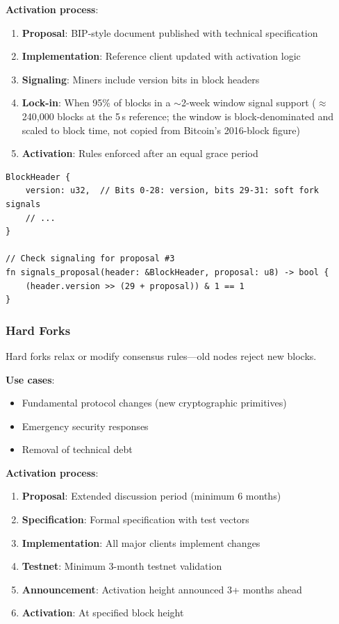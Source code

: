 \textbf{Activation process}:
\begin{enumerate}
  \item \textbf{Proposal}: BIP-style document published with technical specification
  \item \textbf{Implementation}: Reference client updated with activation logic
  \item \textbf{Signaling}: Miners include version bits in block headers
  \item \textbf{Lock-in}: When 95\% of blocks in a $\sim$2-week window signal
    support ($\approx$240{,}000 blocks at the 5\,s reference; the window is
    block-denominated and scaled to block time, not copied from Bitcoin's
    2016-block figure)
  \item \textbf{Activation}: Rules enforced after an equal grace period
\end{enumerate}

\begin{lstlisting}[caption={Soft fork signaling in block header}]
BlockHeader {
    version: u32,  // Bits 0-28: version, bits 29-31: soft fork signals
    // ...
}

// Check signaling for proposal #3
fn signals_proposal(header: &BlockHeader, proposal: u8) -> bool {
    (header.version >> (29 + proposal)) & 1 == 1
}
\end{lstlisting}

\subsubsection{Hard Forks}

Hard forks relax or modify consensus rules---old nodes reject new blocks.

\textbf{Use cases}:
\begin{itemize}
  \item Fundamental protocol changes (new cryptographic primitives)
  \item Emergency security responses
  \item Removal of technical debt
\end{itemize}

\textbf{Activation process}:
\begin{enumerate}
  \item \textbf{Proposal}: Extended discussion period (minimum 6 months)
  \item \textbf{Specification}: Formal specification with test vectors
  \item \textbf{Implementation}: All major clients implement changes
  \item \textbf{Testnet}: Minimum 3-month testnet validation
  \item \textbf{Announcement}: Activation height announced 3+ months ahead
  \item \textbf{Activation}: At specified block height
\end{enumerate}

